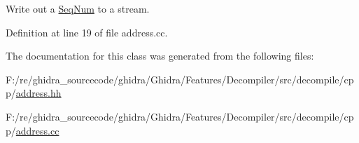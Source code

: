 Write out a \mbox{\hyperlink{class_seq_num}{Seq\+Num}} to a stream. 



Definition at line 19 of file address.\+cc.



The documentation for this class was generated from the following files\+:\begin{DoxyCompactItemize}
\item 
F\+:/re/ghidra\+\_\+sourcecode/ghidra/\+Ghidra/\+Features/\+Decompiler/src/decompile/cpp/\mbox{\hyperlink{address_8hh}{address.\+hh}}\item 
F\+:/re/ghidra\+\_\+sourcecode/ghidra/\+Ghidra/\+Features/\+Decompiler/src/decompile/cpp/\mbox{\hyperlink{address_8cc}{address.\+cc}}\end{DoxyCompactItemize}
